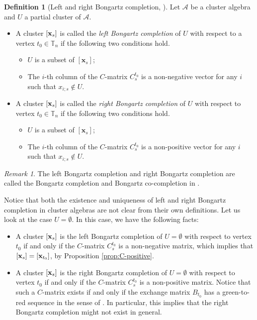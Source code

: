 \documentclass[10pt]{amsart}
\theoremstyle{definition}
\newtheorem{definition}[theorem]{Definition}
\theoremstyle{remark}
\newtheorem{remark}[theorem]{Remark}
\numberwithin{equation}{section}
\def\xx{\mathbf{x}}
\def\Acal{\mathcal{A}}
\begin{document}
\begin{definition}[Left and right Bongartz completion, \cite{CGY-2023}]
\label{def:completion}
Let $\mathcal A$ be a cluster algebra and $U$ a partial cluster of $\Acal$.
\begin{itemize}
\item[(i)] A cluster $[{\bf x}_s]$ is called the {\em left Bongartz completion} of $U$ with respect to a vertex $t_0\in\mathbb T_n$ if the following two conditions hold.
\begin{itemize}
 \item [(a)] $U$ is a subset of $[\xx_s]$;
 \item[(b)] The $i$-th column of the $C$-matrix $C_s^{t_0}$ is a non-negative vector for any $i$ such that $x_{i;s}\notin U$.
\end{itemize}
\item[(ii)] A cluster $[{\bf x}_s]$ is called the {\em right Bongartz completion} of $U$ with respect to vertex $t_0\in\mathbb T_n$ if the following two conditions hold.
\begin{itemize}
 \item [(a$'$)] $U$ is a subset of $[\xx_s]$;
 \item[(b$'$)] The $i$-th column of the $C$-matrix $C_s^{t_0}$ is a non-positive vector for any $i$ such that $x_{i;s}\notin U$.
\end{itemize}
\end{itemize}
\end{definition}
\begin{remark}
  The left Bongartz completion and right Bongartz completion  are called the Bongartz completion and Bongartz co-completion in \cite{CGY-2023}. 
\end{remark}

Notice that both the existence and uniqueness of left and right Bongartz completion in cluster algebras are not clear from their own definitions. Let us look at the case  $U=\emptyset$. In this case,  we have the following facts:
\begin{itemize}
    \item A cluster $[{\bf x}_s]$ is the left Bongartz completion of $U=\emptyset$ with respect to vertex $t_0$ if and only if the $C$-matrix $C_s^{t_0}$ is a non-negative matrix, which implies that $[{\bf x}_s]=[{\bf x}_{t_0}]$, by Proposition \ref{prop:C-positive}.
    \item A cluster $[{\bf x}_s]$ is the right Bongartz completion of $U=\emptyset$ with respect to vertex $t_0$ if and only if the $C$-matrix $C_s^{t_0}$ is a non-positive matrix. Notice that such a $C$-matrix exists if and only if the exchange matrix $B_{t_0}$ has a green-to-red sequence in the sense of \cite{Muller16}. In particular, this implies that the right Bongartz completion might not exist in general.
\end{itemize}
\end{document}
